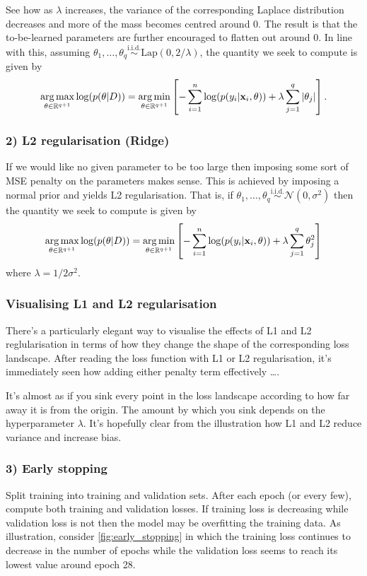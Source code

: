\documentclass[11pt]{article}
\begin{document}
See how as $\lambda$ increases, the variance of the corresponding Laplace distribution decreases and more of the mass becomes centred around 0. The result is that the to-be-learned parameters are further encouraged to flatten out around 0. In line with this, assuming $\theta_1,\dots,\theta_q\overset{\text{i.i.d.}}{\sim}\text{Lap}(0, 2/\lambda)$, the quantity we seek to compute is given by
$$
\operatorname*{arg\,max}_{\theta\in\mathbb{R}^{q+1}}\log(p(\theta|D))
=
\operatorname*{arg\,min}_{\theta\in\mathbb{R}^{q+1}}\left[-\sum_{i=1}^n\log(p(y_i|\mathbf{x}_i,\theta))+\lambda\sum_{j=1}^q|\theta_j|\right].
$$

\subsubsection*{2) L2 regularisation (Ridge)}
If we would like no given parameter to be too large then imposing some sort of MSE penalty on the parameters makes sense. This is achieved by imposing a normal prior and yields L2 regularisation. That is, if $\theta_1,\dots,\theta_q\overset{\text{i.i.d.}}{\sim}\mathcal{N}(0,\sigma^2)$ then the quantity we seek to compute is given by
$$
\operatorname*{arg\,max}_{\theta\in\mathbb{R}^{q+1}}\log(p(\theta|D))
=
\operatorname*{arg\,min}_{\theta\in\mathbb{R}^{q+1}}\left[-\sum_{i=1}^n\log(p(y_i|\mathbf{x}_i,\theta))+\lambda\sum_{j=1}^q \theta_j^2\right]
$$
where $\lambda=1/2\sigma^2$.

\subsubsection*{Visualising L1 and L2 regularisation}
There's a particularly elegant way to visualise the effects of L1 and L2 reglularisation in terms of how they change the shape of the corresponding loss landscape. After reading the loss function with L1 or L2 regularisation, it's immediately seen how adding either penalty term effectively \dots.


It's almost as if you sink every point in the loss landscape according to how far away it is from the origin. The amount by which you sink depends on the hyperparameter $\lambda$. It's hopefully clear from the illustration how L1 and L2 reduce variance and increase bias.

\subsubsection*{3) Early stopping} Split training into training and validation sets. After each epoch (or every few), compute both training and validation losses. If training loss is decreasing while validation loss is not then the model may be overfitting the training data. As illustration, consider \autoref{fig:early_stopping} in which the training loss continues to decrease in the number of epochs while the validation loss seems to reach its lowest value around epoch 28.
\end{document}
